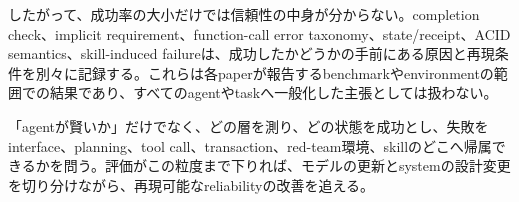 したがって、成功率の大小だけでは信頼性の中身が分からない。completion check、implicit requirement、function-call error taxonomy、state/receipt、ACID semantics、skill-induced failureは、成功したかどうかの手前にある原因と再現条件を別々に記録する。これらは各paperが報告するbenchmarkやenvironmentの範囲での結果であり、すべてのagentやtaskへ一般化した主張としては扱わない。

\begin{claimboundary}[読者の問い]
「agentが賢いか」だけでなく、どの層を測り、どの状態を成功とし、失敗をinterface、planning、tool call、transaction、red-team環境、skillのどこへ帰属できるかを問う。評価がこの粒度まで下りれば、モデルの更新とsystemの設計変更を切り分けながら、再現可能なreliabilityの改善を追える。
\end{claimboundary}
